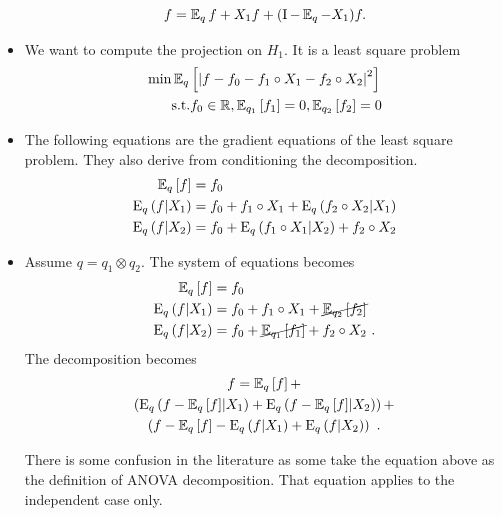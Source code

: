 \documentclass[xcolor=svgnames]{beamer}
\begin{document}
\begin{frame}
\begin{itemize}
\begin{equation*}
        f = \operatorname{\mathbb E}_q f + X_1 f + (\operatorname I  - 
 \operatorname{\mathbb E}_q - X_1) f  .
    \end{equation*}
    \item We want to compute the projection on $H_1$. It is a least square problem
    \begin{align*}
    \min& \operatorname{\mathbb E}_{q}\left[\left\vert f - f_0 - f_1\circ X_1 - f_2\circ X_2\right\vert^2\right] \\    
    &\text{s.t.} f_0 \in \mathbb{R}, \operatorname{\mathbb E}_{q_1}\left[f_1\right] = 0, \operatorname{\mathbb E}_{q_2}\left[f_2\right] = 0
    \end{align*}
    \item The following equations are the gradient equations of the least square problem. They also derive from conditioning the decomposition.
    \begin{align*}
        \operatorname{\mathbb E}_{q}\left[f\right] &= f_0 \\
        \operatorname{E}_{q}\left(f \middle| X_1\right) &= f_0 + f_1\circ X_1 + \operatorname{E}_{q}\left(f_2 \circ X_2 \middle| X_1\right) \\ 
            \operatorname{E}_{q}\left(f \middle| X_2\right) &= f_0 + \operatorname{E}_{q}\left(f_1 \circ X_1 \middle| X_2\right) + f_2\circ X_2
        \end{align*}
        \item Assume $q =q_1 \otimes q_2$. The system of equations becomes
 \begin{align*}
        \operatorname{\mathbb E}_{q}\left[f\right] &= f_0 \\
        \operatorname{E}_{q}\left(f \middle| X_1\right) &= f_0 + f_1\circ X_1 + \cancel{\operatorname{\mathbb E}_{q_2}\left[f_2\right]} \\ 
            \operatorname{E}_{q}\left(f \middle| X_2\right) &= f_0 + \cancel{\operatorname{\mathbb E}_{q_1}\left[f_1\right]} + f_2\circ X_2 \ .
        \end{align*} 
The decomposition becomes
\begin{multline*}
f = \operatorname{\mathbb E}_{q}\left[f\right] + \\
\left(\operatorname{E}_{q}\left(f - \operatorname{\mathbb E}_{q}\left[f\right] \middle| X_1\right) + \operatorname{E}_{q}\left(f - \operatorname{\mathbb E}_{q}\left[f\right] \middle| X_2\right)\right) + \\ 
\left(f - \operatorname{\mathbb E}_{q}\left[f\right] - \operatorname{E}_{q}\left(f \middle| X_1\right) + \operatorname{E}_{q}\left(f  \middle| X_2\right)\right) \ .
\end{multline*}

There is some confusion in the literature as some take the equation above as the definition of ANOVA decomposition. That equation applies to the independent case only.


\end{itemize}
\end{frame}
\end{document}
